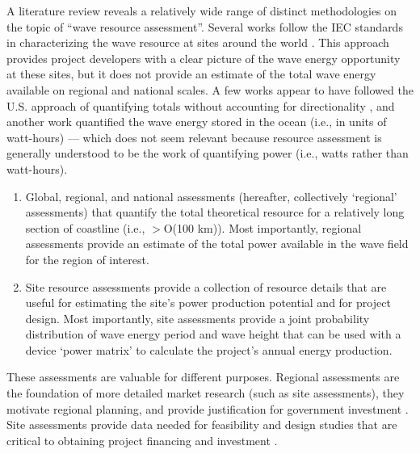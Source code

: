 \documentclass[authoryear,preprint]{elsarticle}
\begin{document}
A literature review reveals a relatively wide range of distinct methodologies on
the topic of “wave resource assessment”. Several works follow the IEC standards
in characterizing the wave resource at sites around the world
\citep{zhengAssessingChinaSea2013,neillWavePowerVariability2013,iglesiasWaveEnergyPotential2009,sierraWaveEnergyResource2013,robertsonCharacterizingShoreWave2014,internationalelectrotechnicalcommissionPart101Wave2015}.
This approach provides project developers with a clear picture of the wave
energy opportunity at these sites, but it does not provide an estimate of the
total wave energy available on regional and national scales. A few works appear
to have followed the U.S. approach of quantifying totals without accounting for
directionality \citep{kumarWaveEnergyResource2015}, and another work quantified
the wave energy stored in the ocean \citep{hughesNationalscaleWaveEnergy2010}
(i.e., in units of watt-hours) — which does
not seem relevant because resource assessment is generally understood to be the
work of quantifying power (i.e., watts rather than watt-hours).

\begin{enumerate}
\item Global, regional, and national assessments (hereafter, collectively ‘regional’ assessments) that quantify the total theoretical resource for a relatively long section of coastline (i.e., $>$O(100 km)). Most importantly, regional assessments provide an estimate of the total power available in the wave field for the region of interest.
\item Site resource assessments provide a collection of resource details that are useful for estimating the site’s power production potential and for project design. Most importantly, site assessments provide a joint probability distribution of wave energy period and wave height that can be used with a device ‘power matrix’ to calculate the project’s annual energy production.
\end{enumerate}

These assessments are valuable for different purposes. Regional assessments are the foundation of more detailed market research (such as site assessments), they motivate regional planning, and provide justification for government investment \citep[e.g., ][]{EPRIwaveresource2011,gunnQuantifyingGlobalWave2012,regueroGlobalWavePower2015,motaWaveEnergyPotential2014}. Site assessments provide data needed for feasibility and design studies that are critical to obtaining project financing and investment \citep[]{robertsonCharacterizingShoreWave2014,iglesiasWaveEnergyPotential2009}.
\end{document}

